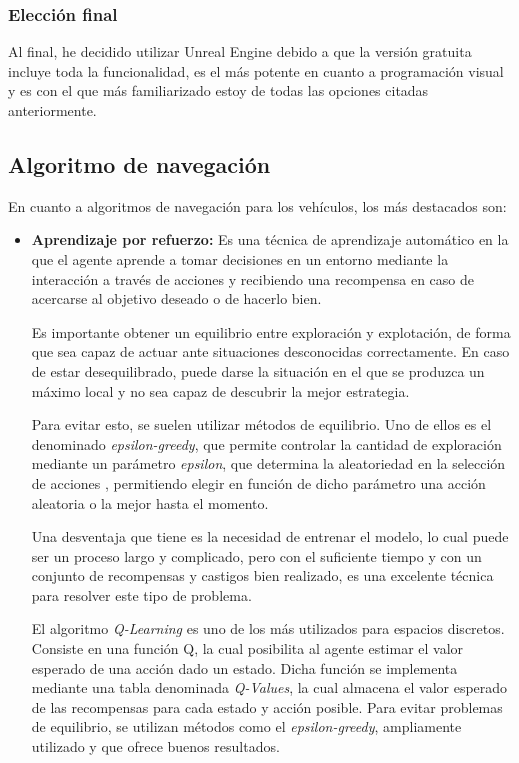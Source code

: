 \subsubsection{Elección final}

Al final, he decidido utilizar Unreal Engine debido a que la versión gratuita incluye toda la funcionalidad, es el más potente en cuanto a programación visual y es con el que más familiarizado estoy de todas las opciones citadas anteriormente.

\subsection{Algoritmo de navegación}
En cuanto a algoritmos de navegación para los vehículos, los más destacados son:

\begin{itemize}
   \item \textbf{Aprendizaje por refuerzo:} Es una técnica de aprendizaje automático en la que el agente aprende a tomar decisiones en un entorno mediante la interacción a través de acciones
   y recibiendo una recompensa en caso de acercarse al objetivo deseado o de hacerlo bien. 
   
   Es importante obtener un equilibrio entre exploración y explotación, de forma que sea capaz de actuar ante situaciones desconocidas correctamente. En caso de estar desequilibrado, puede darse la situación en el que se produzca un máximo local y no sea capaz de descubrir la mejor estrategia.

   
   Para evitar esto, se suelen utilizar métodos de equilibrio. Uno de ellos es el denominado \textit{epsilon-greedy}, que permite controlar la cantidad de exploración mediante un parámetro \textit{epsilon}, que determina la aleatoriedad en la selección de acciones \cite{10.1007/978-3-642-24455-1_33}, permitiendo elegir en función de dicho parámetro una acción aleatoria o la mejor hasta el momento.

   Una desventaja que tiene es la necesidad de entrenar el modelo, lo cual puede ser un proceso largo y complicado, pero con el suficiente tiempo y con un conjunto de recompensas y castigos bien realizado, es una excelente técnica para resolver este tipo de problema.

   El algoritmo \textit{Q-Learning} es uno de los más utilizados para espacios discretos. Consiste en una función Q, la cual posibilita al agente estimar el valor esperado de una acción dado un estado. Dicha función se implementa mediante una tabla denominada \textit{Q-Values}, la cual almacena el valor esperado de las recompensas para cada estado y acción posible. Para evitar problemas de equilibrio, se utilizan métodos como el \textit{epsilon-greedy}, ampliamente utilizado y que ofrece buenos resultados.


\end{itemize}
